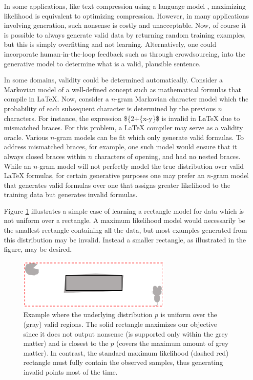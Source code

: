 In some applications, like text compression using a language model \citep{WittenNC87}, maximizing likelihood is equivalent to optimizing compression. However, in many  applications involving generation, such nonsense is costly and unacceptable. Now, of course it is possible to always generate valid data by returning random training examples, but this is simply overfitting and not learning. Alternatively, one could incorporate human-in-the-loop feedback such as through crowdsourcing, into the generative model to determine what is a valid, plausible sentence.

In some domains, validity could be determined automatically. Consider a Markovian model of a well-defined concept such as mathematical formulas that compile in \LaTeX{}. Now, consider a $n$-gram Markovian character model which the probability of each subsequent character is determined by the previous $n$ characters. For instance, the expression \$\{2+\{x-y\}\$ is invalid in \LaTeX{} due to mismatched braces. For this problem, a \LaTeX{} compiler may serve as a validity oracle. Various $n$-gram models can be fit which only generate valid formulas. To address mismatched braces, for example, one such model would ensure that it always closed braces within $n$ characters of opening, and had no nested braces. While an $n$-gram model will not perfectly model the true distribution over valid \LaTeX{} formulas, for certain generative purposes one may prefer an $n$-gram model that generates valid formulas over one that assigns greater likelihood to the training data but generates invalid formulas. 

Figure \ref{fig:rectangle} illustrates a simple case of learning a rectangle model for data which is not uniform over a rectangle. A maximum likelihood model would necessarily be the smallest rectangle containing all the data, but most examples generated from this distribution may be invalid. Instead a smaller rectangle, as illustrated in the figure, may be desired.

\begin{figure}[h]\label{fig:rectangle}
\centering
\includegraphics[width=3in]{fig.pdf}
\caption{Example where the underlying distribution $p$ is uniform over the (gray) valid regions. The solid rectangle maximizes our objective since it does not output nonsense (is supported only within the grey matter) and is closest to the $p$ (covers the maximum amount of grey matter). In contrast, the standard maximum likelihood (dashed red) rectangle must fully contain the observed samples, thus generating invalid points most of the time.  }
\end{figure}

